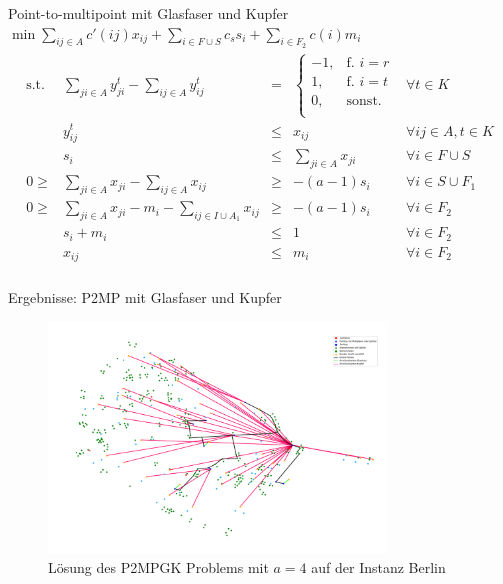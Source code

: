 \documentclass{beamer}
\begin{document}
\begin{frame}{Point-to-multipoint mit Glasfaser und Kupfer}
	  $\min \displaystyle\sum_{ij \in A} c'(ij) x_{ij} + \displaystyle\sum_{i \in F \cup S} c_s s_i + \displaystyle\sum_{i \in F_2} c(i) m_i$
	  \begin{align*}
	  \begin{array}{ccrcl}
	  \textrm{s.t.}  
	   &\displaystyle\sum_{ji \in A} y_{ji}^t - \displaystyle\sum_{ij \in A} y_{ij}^t& = & \left\{\begin{array}{cl} 
	  -1, & \text{f. } i=r\\ 
	  1, & \text{f. } i=t\\ 
	  0, & \text{sonst.}\\ 
	  \end{array}
	  \right. & \forall t \in K \\
	  & y_{ij}^t & \leq & x_{ij} & \forall ij \in A, t\in K \\
	  & s_i &\leq& \displaystyle\sum_{ji \in A} x_{ji}& \forall  i \in F \cup S \\ 
	  0\geq&\displaystyle\sum_{ji \in A} x_{ji} - \displaystyle\sum_{ij \in A} x_{ij}&\geq& -(a-1)s_i & \forall i \in S \cup F_1\\
	  0\geq&\displaystyle\sum_{ji \in A} x_{ji} -m_i - \displaystyle\sum_{ij \in I \cup A_1} x_{ij}&\geq& -(a-1)s_i & \forall i \in F_2\\
	  &s_i+m_i & \leq & 1 & \forall i \in F_2 \\
	  &x_{ij}& \leq & m_i & \forall i \in F_2 \\
	  \end{array}
	  \end{align*}
\end{frame}

\begin{frame}{Ergebnisse: P2MP mit Glasfaser und Kupfer}
	\begin{figure}[!htbp]
		\centering
				\includegraphics[width=0.8\textwidth]{./Bilder/P2MPGK_Berlin_demand1_duration0}
				\caption{L\"osung des P2MPGK Problems mit \(a = 4\) auf der Instanz Berlin}
				\label{p2mpgk_b_pic_sn4}
	\end{figure}
\end{frame}
\end{document}
